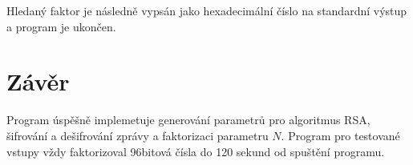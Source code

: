 \documentclass[11pt,a4paper]{article}
\begin{document}
Hledaný faktor je následně vypsán jako hexadecimální číslo na standardní výstup a program je ukončen.

\section{Závěr}

Program úspěšně implemetuje generování parametrů pro algoritmus RSA, šifrování a dešifrování zprávy a faktorizaci parametru $N$.
Program pro testované vstupy vždy faktorizoval 96bitová čísla do 120 sekund od spuštění programu.
\end{document}
